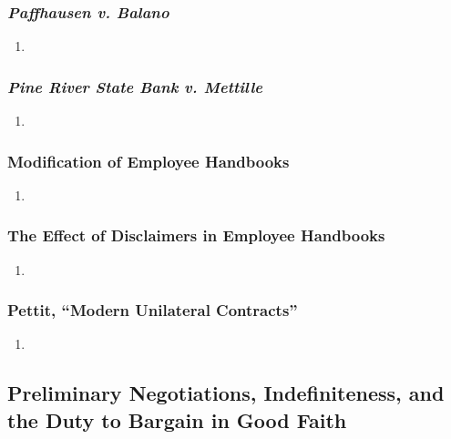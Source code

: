 \subsubsection{\emph{Paffhausen v. Balano}}

\begin{enumerate}
    \item %
\end{enumerate}

\subsubsection{\emph{Pine River State Bank v. Mettille}}

\begin{enumerate}
    \item %
\end{enumerate}

\subsubsection{Modification of Employee Handbooks}

\begin{enumerate}
    \item %
\end{enumerate}

\subsubsection{The Effect of Disclaimers in Employee Handbooks}

\begin{enumerate}
    \item %
\end{enumerate}

\subsubsection{Pettit, ``Modern Unilateral Contracts''}

\begin{enumerate}
    \item %
\end{enumerate}

\subsection{Preliminary Negotiations, Indefiniteness, and the Duty to Bargain 
in Good Faith}

